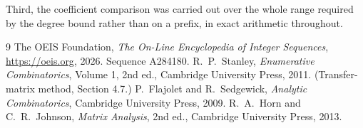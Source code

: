 \documentclass[11pt,a4paper]{article}
\theoremstyle{plain}
\theoremstyle{definition}
\begin{document}
Third, the coefficient comparison was carried out over the whole range required by the degree
bound rather than on a prefix, in exact arithmetic throughout.

\begin{thebibliography}{9}
 The OEIS Foundation, \emph{The On-Line Encyclopedia of Integer
Sequences}, \url{https://oeis.org}, 2026. Sequence A284180.
 R.~P.~Stanley, \emph{Enumerative Combinatorics}, Volume 1, 2nd ed.,
Cambridge University Press, 2011. (Transfer-matrix method, Section 4.7.)
 P.~Flajolet and R.~Sedgewick, \emph{Analytic Combinatorics}, Cambridge
University Press, 2009.
 R.~A.~Horn and C.~R.~Johnson, \emph{Matrix Analysis}, 2nd ed., Cambridge
University Press, 2013.
\end{thebibliography}
\end{document}
